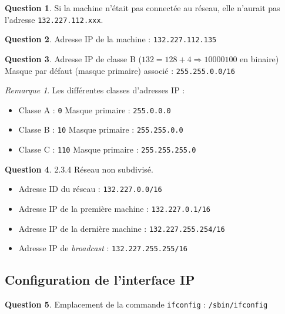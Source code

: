 \documentclass[11pt,english,french]{scrreprt}
\theoremstyle{remark}
\newtheorem*{rem*}{Remarque}
\theoremstyle{definition}
\newtheorem{ques*}{Question}[subsection]
\begin{document}
\begin{ques*}
Si la machine n'était pas connectée au réseau, elle n'aurait pas l'adresse \lstinline!132.227.112.xxx!.
\end{ques*}

\begin{ques*}
Adresse IP de la machine : \lstinline!132.227.112.135!
\end{ques*}

\begin{ques*}
Adresse IP de classe B ($132 = 128+4 \Rightarrow 10000100$ en binaire)\\
Masque par défaut (masque primaire) associé : \lstinline!255.255.0.0/16!
\end{ques*}

\begin{rem*}
	Les différentes classes d'adresses IP :
\begin{itemize}
	\item Classe A : \lstinline!0!	 \qquad Masque primaire : \lstinline!255.0.0.0!
	\item Classe B : \lstinline!10!	 \qquad Masque primaire : \lstinline!255.255.0.0!
	\item Classe C : \lstinline!110! \qquad Masque primaire : \lstinline!255.255.255.0!
\end{itemize}
\end{rem*}

\begin{ques*}
2.3.4 Réseau non subdivisé. 
\begin{itemize}
	\item Adresse ID du réseau : \lstinline!132.227.0.0/16!
	\item Adresse IP de la première machine : \lstinline!132.227.0.1/16!
	\item Adresse IP de la dernière machine : \lstinline!132.227.255.254/16!
	\item Adresse IP de \emph{broadcast} : \lstinline!132.227.255.255/16!
\end{itemize}
\end{ques*}

\subsection{Configuration de l'interface IP}

\begin{ques*}
Emplacement de la commande \lstinline!ifconfig! : \lstinline!/sbin/ifconfig!
\end{ques*}
\end{document}
